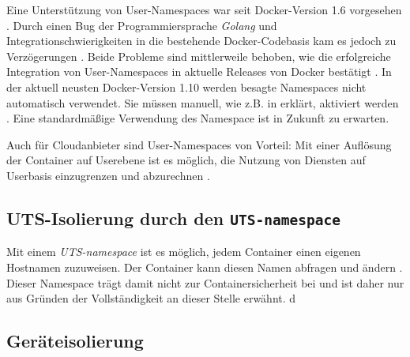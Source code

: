 \documentclass[../main.tex]{subfiles}
\begin{document}
			Eine Unterstützung von User-Namespaces war seit Docker-Version 1.6 vorgesehen \cite{githubUserNamespaceProposal}. Durch einen Bug der Programmiersprache \emph{Golang} und Integrationschwierigkeiten in die bestehende Docker-Codebasis kam es jedoch zu Verzögerungen \cite{nsUserGolangBug}\cite{githubUserNamespaceConflict}\cite{githubUserNamespaceIntegration}. Beide Probleme sind mittlerweile behoben, wie die erfolgreiche Integration von User-Namespaces in aktuelle Releases von Docker bestätigt \cite{githubUserNamespaceIntegration}. In der aktuell neusten Docker-Version 1.10 werden besagte Namespaces nicht automatisch verwendet. Sie müssen manuell, wie z.B. in \cite{nsUserEnable} erklärt, aktiviert werden \cite{githubDockerChangelog}. Eine standardmäßige Verwendung des Namespace ist in Zukunft zu erwarten.





			Auch für Cloudanbieter sind User-Namespaces von Vorteil: Mit einer Auflösung der Container auf Userebene ist es möglich, die Nutzung von Diensten auf Userbasis einzugrenzen und abzurechnen \cite[S.3]{nsUserContainerCon}.

		\subsection{\acrshort{UTS}-Isolierung durch den \texttt{\acrshort{UTS}-namespace}}
			Mit einem \emph{\acrshort{UTS}-namespace} ist es möglich, jedem Container einen eigenen Hostnamen zuzuweisen. Der Container kann diesen Namen abfragen und ändern \cite[S.3]{virtVSContainer}. Dieser Namespace trägt damit nicht zur Containersicherheit bei und ist daher nur aus Gründen der Vollständigkeit an dieser Stelle erwähnt.
d
		\subsection{Geräteisolierung}
\end{document}

